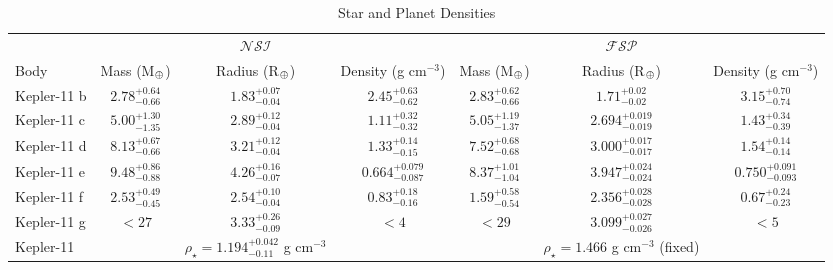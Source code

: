\documentclass[twocolumn,trackchanges]{aastex61}
\begin{document}
\begin{table}
\caption{Star and Planet Densities}
\label{table:den}
\centering 
\begin{tabular}{l | c c c | c c c} 
\hline
 & & $\mathcal{NSI}$ & & & $\mathcal{FSP}$ &  \\
Body & Mass (M$_\oplus$) & Radius (R$_\oplus$) & Density (g cm$^{-3}$) & Mass (M$_\oplus$) & Radius (R$_\oplus$) & Density (g cm$^{-3}$) \\
\hline
Kepler-11 b & $2.78^{+0.64}_{-0.66}$ & $1.83^{+0.07}_{-0.04} $ & $2.45^{+0.63}_{-0.62} $ & $2.83^{+0.62}_{-0.66}$ & $1.71^{+0.02}_{-0.02}$ & $ 3.15^{+0.70}_{-0.74} $  \\
Kepler-11 c & $5.00^{+1.30}_{-1.35}$ & $2.89^{+0.12}_{-0.04}$ & $1.11^{+0.32}_{-0.32}$ & $5.05^{+1.19}_{-1.37}$ & $2.694^{+0.019}_{-0.019}$ & $ 1.43^{+0.34}_{-0.39} $ \\
Kepler-11 d & $8.13^{+0.67}_{-0.66}$ & $3.21^{+0.12}_{-0.04}$ & $ 1.33^{+0.14}_{-0.15} $ & $7.52^{+0.68}_{-0.68}$ & $3.000^{+0.017}_{-0.017}$ & $ 1.54^{+0.14}_{-0.14} $ \\
Kepler-11 e & $9.48^{+0.86}_{-0.88}$ & $4.26^{+0.16}_{-0.07}$ &  $ 0.664^{+0.079}_{-0.087} $ & $8.37^{+1.01}_{-1.04}$ & $3.947^{+0.024}_{-0.024}$ & $ 0.750^{+0.091}_{-0.093} $ \\
Kepler-11 f & $2.53^{+0.49}_{-0.45}$ & $2.54^{+0.10}_{-0.04}$ & $ 0.83^{+0.18}_{-0.16} $  & $1.59^{+0.58}_{-0.54}$ & $2.356^{+0.028}_{-0.028}$ & $ 0.67^{+0.24}_{-0.23} $  \\
Kepler-11 g & $ <  27$ & $3.33^{+0.26}_{-0.09}$ & $ <  4 $ & $<  29$ & $3.099^{+0.027}_{-0.026}$ & $ < 5 $\\
\hline    
Kepler-11  & & $\rho_{\star} = 1.194^{+0.042}_{-0.11} $ g cm$^{-3}$  & & & $\rho_{\star} = 1.466 $ g cm$^{-3}$ (fixed) & \\
\hline   
\end{tabular}

\end{table}
\end{document}
